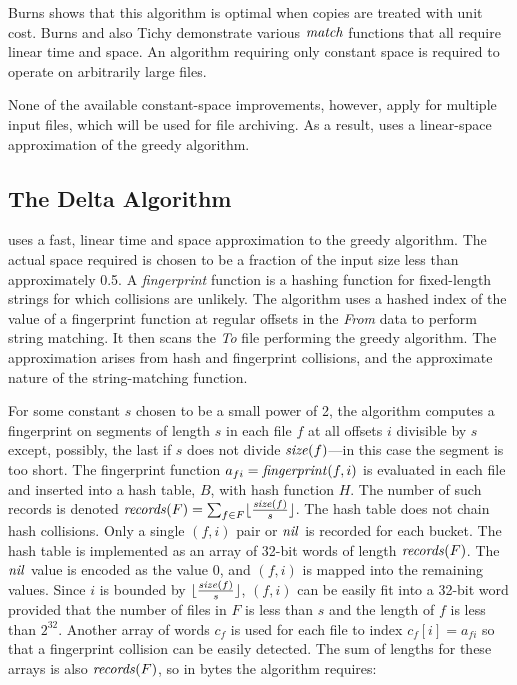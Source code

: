 \documentclass{llncs}
\begin{document}
Burns \cite{Burns:Thesis} shows that this algorithm is optimal when
copies are treated with unit cost.  Burns and also Tichy
\cite{Tichy84} demonstrate various $\textrm{\emph{match}}$ functions that all require
linear time and space.  An algorithm requiring only constant space is
required to operate on arbitrarily large files.

None of the available constant-space improvements, however, apply for
multiple input files, which will be used for file archiving.  As a
result, \xd {} uses a linear-space approximation of the greedy
algorithm.

\subsection{The \xd {} Delta Algorithm}

\xd {} uses a fast, linear time and space approximation to the greedy
algorithm.  The actual space required is chosen to be a fraction of
the input size less than approximately 0.5.  A \emph{fingerprint}
function is a hashing function for fixed-length strings for which
collisions are unlikely.  The algorithm uses a hashed index of the
value of a fingerprint function at regular offsets in the \emph{From}
data to perform string matching.  It then scans the \emph{To} file
performing the greedy algorithm.  The approximation arises from hash
and fingerprint collisions, and the approximate nature of the
string-matching function.

For some constant $s$ chosen to be a small power of 2, the algorithm
computes a fingerprint on segments of length $s$ in each file $f$ at
all offsets $i$ divisible by $s$ except, possibly, the last if $s$
does not divide $\textrm{\emph{size}}(f)$---in this case the segment is too short.
The fingerprint function $a_{fi} = \textrm{\emph{fingerprint}}(f, i)$ is evaluated in
each file and inserted into a hash table, $B$, with hash function $H$.
The number of such records is denoted $\textrm{\emph{records}}(F) = \sum_{f \in F}
\lfloor \frac{\textrm{\emph{size}}(f)}{s} \rfloor$.  The hash table does not chain
hash collisions.  Only a single $(f,i)$ pair or $\textrm{\emph{nil}}$ is recorded for
each bucket.  The hash table is implemented as an array of 32-bit
words of length $\textrm{\emph{records}}(F)$.  The $\textrm{\emph{nil}}$ value is encoded as the
value 0, and $(f,i)$ is mapped into the remaining values.  Since $i$
is bounded by $\lfloor \frac{\textrm{\emph{size}}(f)}{s} \rfloor$, $(f,i)$ can be
easily fit into a 32-bit word provided that the number of files in $F$
is less than $s$ and the length of $f$ is less than $2^{32}$.  Another
array of words $c_{f}$ is used for each file to index $c_{f}[i] =
a_{fi}$ so that a fingerprint collision can be easily detected.  The
sum of lengths for these arrays is also $\textrm{\emph{records}}(F)$, so in bytes the
algorithm requires:
\end{document}
